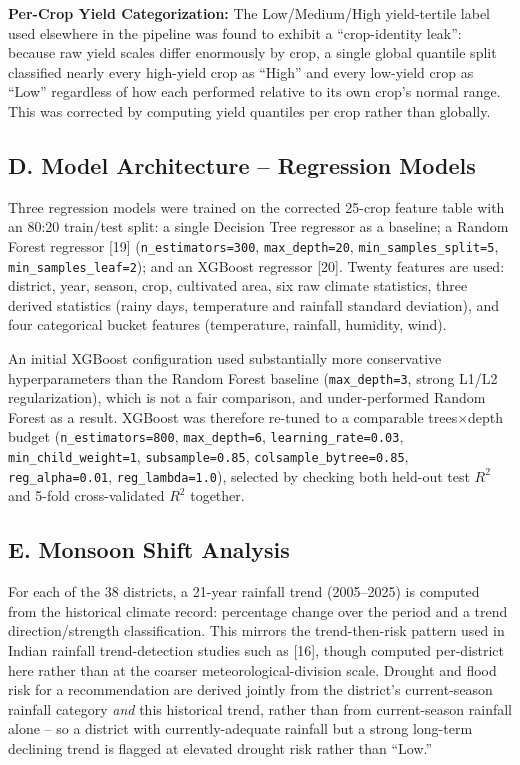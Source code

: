 \documentclass[12pt,a4paper,twocolumn]{article}
\begin{document}
\textbf{Per-Crop Yield Categorization:} The Low/Medium/High yield-tertile label used
elsewhere in the pipeline was found to exhibit a ``crop-identity leak'': because raw
yield scales differ enormously by crop, a single global quantile split classified
nearly every high-yield crop as ``High'' and every low-yield crop as ``Low''
regardless of how each performed relative to its own crop's normal range. This was
corrected by computing yield quantiles per crop rather than globally.

\subsection*{D. Model Architecture -- Regression Models}

Three regression models were trained on the corrected 25-crop feature table with an
80:20 train/test split: a single Decision Tree regressor as a baseline; a Random
Forest regressor [19] (\texttt{n\_estimators=300}, \texttt{max\_depth=20},
\texttt{min\_samples\_split=5}, \texttt{min\_samples\_leaf=2}); and an XGBoost
regressor [20]. Twenty features are used: district, year, season, crop, cultivated
area, six raw climate statistics, three derived statistics (rainy days, temperature
and rainfall standard deviation), and four categorical bucket features (temperature,
rainfall, humidity, wind).

An initial XGBoost configuration used substantially more conservative hyperparameters
than the Random Forest baseline (\texttt{max\_depth=3}, strong L1/L2
regularization), which is not a fair comparison, and under-performed Random Forest as
a result. XGBoost was therefore re-tuned to a comparable trees$\times$depth budget
(\texttt{n\_estimators=800}, \texttt{max\_depth=6}, \texttt{learning\_rate=0.03},
\texttt{min\_child\_weight=1}, \texttt{subsample=0.85},
\texttt{colsample\_bytree=0.85}, \texttt{reg\_alpha=0.01}, \texttt{reg\_lambda=1.0}),
selected by checking both held-out test $R^2$ and 5-fold cross-validated $R^2$
together.

\subsection*{E. Monsoon Shift Analysis}

For each of the 38 districts, a 21-year rainfall trend (2005--2025) is computed from
the historical climate record: percentage change over the period and a trend
direction/strength classification. This mirrors the trend-then-risk pattern used in
Indian rainfall trend-detection studies such as [16], though computed per-district
here rather than at the coarser meteorological-division scale. Drought and flood risk
for a recommendation are derived jointly from the district's current-season rainfall
category \emph{and} this historical trend, rather than from current-season rainfall
alone -- so a district with currently-adequate rainfall but a strong long-term
declining trend is flagged at elevated drought risk rather than ``Low.''
\end{document}

